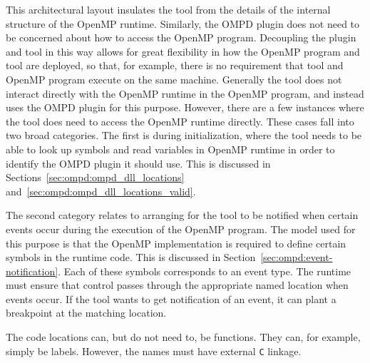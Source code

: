 This architectural layout insulates the tool from the details
of the internal structure of the OpenMP runtime.
Similarly, the OMPD plugin does not need to be concerned about
how to access the OpenMP program.
Decoupling the plugin and tool in this way allows for
great flexibility in how the OpenMP program and tool are deployed,
so that, for example, there is no requirement that tool
and OpenMP program execute on the same machine.
Generally the tool does not interact directly with the OpenMP
runtime in the OpenMP program, and instead uses the OMPD plugin
for this purpose.
However, there are a few instances where the tool does need
to access the OpenMP runtime directly.
These cases fall into two broad categories.
The first is during initialization, where the tool needs
to be able to look up symbols and read variables in OpenMP runtime
in order to identify the OMPD plugin it should use.
This is discussed in Sections~\ref{sec:ompd:ompd_dll_locations}
and~\ref{sec:ompd:ompd_dll_locations_valid}.

The second category relates to arranging for the tool to be notified
when certain events occur during the execution of the OpenMP program.
The model used for this purpose is that the OpenMP implementation
is required to define certain symbols in the runtime code.
This is discussed in Section~\ref{sec:ompd:event-notification}.
Each of these symbols corresponds to an event type.
The runtime must ensure that control passes through the appropriate
named location when events occur.
If the tool wants to get notification of an event, it can plant
a breakpoint at the matching location.

The code locations can, but do not need to, be functions.
They can, for example, simply be labels.
However, the names must have external \texttt{C} linkage.

